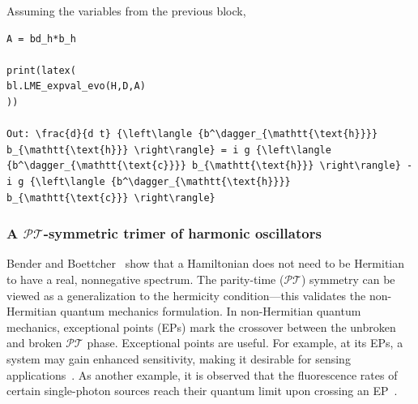 \documentclass[onecolumn, 12pt, sort&compress]{elsarticle}
\begin{document}
Assuming the variables from the previous block, 
\begin{verbatim}
A = bd_h*b_h

print(latex(
bl.LME_expval_evo(H,D,A)
))

Out: \frac{d}{d t} {\left\langle {b^\dagger_{\mathtt{\text{h}}}} b_{\mathtt{\text{h}}} \right\rangle} = i g {\left\langle {b^\dagger_{\mathtt{\text{c}}}} b_{\mathtt{\text{h}}} \right\rangle} - i g {\left\langle {b^\dagger_{\mathtt{\text{h}}}} b_{\mathtt{\text{c}}} \right\rangle}
\end{verbatim}


\subsubsection{A $\mathcal{P}\mathcal{T}$-symmetric trimer of harmonic oscillators}

Bender and Boettcher~\cite{Bender1998} show that a Hamiltonian does not need to be Hermitian to have a real, nonnegative spectrum. The parity-time ($\mathcal{P}\mathcal{T}$) symmetry can be viewed as a generalization to the hermicity condition---this validates the non-Hermitian quantum mechanics formulation. In non-Hermitian quantum mechanics, exceptional points (EPs) mark the crossover between the unbroken and broken $\mathcal{P}\mathcal{T}$ phase. Exceptional points are useful. For example, at its EPs, a system may gain enhanced sensitivity, making it desirable for sensing applications~\cite{Wiersig2020}. As another example, it is observed that the fluorescence rates of certain single-photon sources reach their quantum limit upon crossing an EP~\cite{Zhou2024}. 
\end{document}
